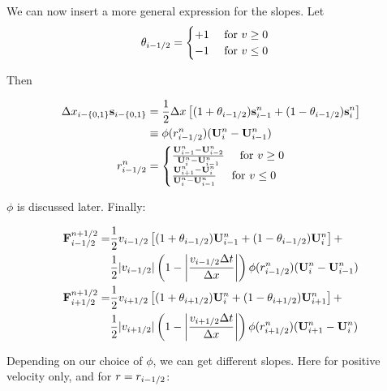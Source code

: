 We can now insert a more general expression for the slopes.
Let 
\begin{align}
	\theta_{i-1/2} = \begin{cases} +1 \quad \text{ for } v \geq 0 \\ -1 \quad  \text{ for } v \leq{0} \end{cases}
\end{align}

Then

\begin{align}
	\Delta x_{i-\{0, 1\}} \mathbf{s}_{i-\{0,1\}} 
		&= \frac{1}{2} \Delta x \left[ (1 + \theta_{i-1/2}) \mathbf{s}_{i-1}^n + (1 - \theta_{i-1/2})  \mathbf{s}_{i}^n \right]  \\
	&\equiv \phi(r_{i-1/2}^n) (\mathbf{U}_i^n - \mathbf{U}_{i-1}^n ) \\
	r^n_{i-1/2} &= \begin{cases}
		\frac{\mathbf{U}_{i-1}^n - \mathbf{U}_{i-2}^n}{\mathbf{U}_{i}^n - \mathbf{U}_{i-1}^n} 	\quad \text{ for } v  \geq 0 \\
		\frac{\mathbf{U}_{i+1}^n - \mathbf{U}_{i}^n}{\mathbf{U}_{i}^n - \mathbf{U}_{i-1}^n} 	\quad \text{ for } v  \leq 0 \\
	\end{cases} 
\end{align}

$\phi$ is discussed later. Finally:

\begin{align}
	\mathbf{F}_{i-1/2}^{n+1/2} = 
		&\frac{1}{2} v_{i-1/2} \left[  (1 + \theta_{i-1/2}) \mathbf{U}_{i-1}^n + (1 - \theta_{i-1/2})  \mathbf{U}_{i}^n \right] +\nonumber\\
		&\frac{1}{2}| v_{i-1/2} | \left( 1 - \left| \frac{v_{i-1/2} \Delta t}{\Delta x} \right| \right) \phi(r_{i-1/2}^n) (\mathbf{U}_i^n - \mathbf{U}_{i-1}^n ) \label{eq:advection_phi1}\\
	\mathbf{F}_{i+1/2}^{n+1/2} = 
		&\frac{1}{2} v_{i+1/2} \left[  (1 + \theta_{i+1/2}) \mathbf{U}_{i}^n + (1 - \theta_{i+1/2})  \mathbf{U}_{i+1}^n \right] +\nonumber\\
		&\frac{1}{2}| v_{i+1/2} | \left( 1 - \left| \frac{v_{i+1/2} \Delta t}{\Delta x} \right| \right) \phi(r_{i+1/2}^n) (\mathbf{U}_{i+1}^n - \mathbf{U}_{i}^n ) \label{eq:advection_phi2}
\end{align}







Depending on our choice of $\phi$, we can get different slopes. Here for positive velocity only, and for $r = r_{i-1/2}$:

